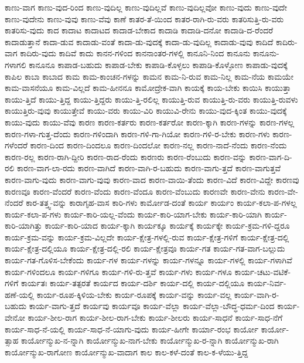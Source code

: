 {ಕಾಣು-ವಾಗ
ಕಾಣು-ವುದ-ರಿಂದ
ಕಾಣು-ವುದಿಲ್ಲ
ಕಾಣು-ವುದಿಲ್ಲವೆ
ಕಾಣು-ವುದಿಲ್ಲವೋ
ಕಾಣು-ವುದು
ಕಾಣು-ವುದೇ
ಕಾಣು-ವುದೇನು
ಕಾಣು-ವುವು
ಕಾಣು-ವೆವು
ಕಾಣೆ
ಕಾತರ-ತೆ-ಯಿಂದ
ಕಾತರ-ರಾಗಿ-ರು-ವರು
ಕಾತರಿಸುತ್ತಿ-ರು-ವರು
ಕಾತರಿಸು-ವುದು
ಕಾದ
ಕಾದಾಟ
ಕಾದಾಟದ
ಕಾದಾಡ-ಬೇಕಾದ
ಕಾದಾಡಿ
ಕಾದಾಡಿ-ದನೋ
ಕಾದಾಡಿ-ದ-ರೆಂದರೆ
ಕಾದಾಡುತ್ತಾನೆ
ಕಾದಾ-ಡುವ
ಕಾದಾಡು-ವಂತೆ
ಕಾದಾ-ಡು-ವುದಕ್ಕೆ
ಕಾದಾ-ಡು-ವುದಿಲ್ಲ
ಕಾದಾಡು-ವುವು
ಕಾದಿದೆ
ಕಾದಿರು-ವಾಗ
ಕಾದಿರು-ವುದು
ಕಾದಿವೆ
ಕಾದು
ಕಾನನ-ಗಳಿಂದ
ಕಾನನಾಂತರ-ಗಳಲ್ಲಿ
ಕಾನೂನಿ-ನಿಂದ
ಕಾನೂನು
ಕಾನೂನು-ಗಳಾಗಲಿ
ಕಾನೂನೂ
ಕಾಪಾಡ-ಬಹುದು
ಕಾಪಾಡ-ಬೇಕು
ಕಾಪಾಡಿ-ಕೊಳ್ಳಲು
ಕಾಪಾಡಿ-ಕೊಳ್ಳೋಣ
ಕಾಪಾಡು-ವುದಕ್ಕೆ
ಕಾಪಿಲ
ಕಾಬಾ
ಕಾಬಾದ
ಕಾಮ
ಕಾಮ-ಕಾಂಚನ-ಗಳನ್ನು
ಕಾಮನ
ಕಾಮ-ನಿ-ರುವ
ಕಾಮ-ನಿಲ್ಲ
ಕಾಮ-ನೆಯ
ಕಾಮಯೇ
ಕಾಮ-ವಾಸನೆಯೂ
ಕಾಮ-ವಿಲ್ಲದೆ
ಕಾಮ-ಹೀನನೂ
ಕಾಮೋದ್ರೇಕ-ವಾಗಿ
ಕಾಯಕ್ಕೆ
ಕಾಯ-ಬೇಕು
ಕಾಯಿಸಿ
ಕಾಯುತ್ತಾ
ಕಾಯು-ತ್ತಿದೆ
ಕಾಯು-ತ್ತಿದ್ದ
ಕಾಯು-ತ್ತಿದ್ದರು
ಕಾಯು-ತ್ತಿ-ರಲಿಲ್ಲ
ಕಾಯುತ್ತಿ-ರುವ
ಕಾಯುತ್ತಿ-ರು-ವರು
ಕಾಯುತ್ತಿ-ರುವಳು
ಕಾಯುತ್ತಿರು-ವುವು
ಕಾಯುತ್ತೇವೆ
ಕಾಯು-ವರು
ಕಾಯು-ವಿರಿ
ಕಾಯುವಿ-ರೇನು
ಕಾಯು-ವುದ-ಕ್ಕಿಂತ
ಕಾಯು-ವುದಕ್ಕೆ
ಕಾಯು-ವುದು
ಕಾಯು-ವೆವು
ಕಾರಣ
ಕಾರಣ-ಕರ್ತರು
ಕಾರಣ-ಕರ್ತರೋ
ಕಾರಣ-ಕ್ಕಾಗಿ
ಕಾರಣ-ಗಳನ್ನು
ಕಾರಣ-ಗಳಲ್ಲ
ಕಾರಣ-ಗಳಾ-ಗುತ್ತ-ದೆಂದು
ಕಾರಣ-ಗಳಿಂದಾಗಿ
ಕಾರಣ-ಗಳಿ-ಗಾ-ಗಿಯೋ
ಕಾರಣ-ಗಳಿ-ರ-ಬೇಕು
ಕಾರಣ-ಗಳು
ಕಾರಣ-ಗಳೆಂದರೆ
ಕಾರಣ-ದಿಂದ
ಕಾರಣ-ದಿಂದಲೂ
ಕಾರಣ-ದಿಂದಲೋ
ಕಾರಣ-ನಲ್ಲ
ಕಾರಣ-ನಾದೆ-ನೆಂದು
ಕಾರಣ-ನೆಂದು
ಕಾರಣ-ರಲ್ಲ
ಕಾರಣ-ರಾಗಿ-ದ್ದೀರಿ
ಕಾರಣ-ರಾದ-ರೆಂದು
ಕಾರಣರು
ಕಾರಣ-ರೆಂಬುದು
ಕಾರಣ-ವನ್ನು
ಕಾರಣ-ವಾಗ-ದಿ-ರಲಿ
ಕಾರಣ-ವಾಗ-ಲಾ-ರದು
ಕಾರಣ-ವಾಗಿದೆ
ಕಾರಣ-ವಾಗಿ-ರ-ಬಹುದು
ಕಾರಣ-ವಾಗು-ತ್ತದೆ
ಕಾರಣ-ವಾಗುತ್ತವೆ
ಕಾರಣ-ವಾಗು-ವುದು
ಕಾರಣ-ವಾಗು-ವುವು
ಕಾರಣ-ವಾದ
ಕಾರಣ-ವಾಯಿ-ತೆಂದು
ಕಾರಣ-ವಿದೆ
ಕಾರಣ-ವಿದ್ದೇ
ಕಾರಣವು
ಕಾರಣವೂ
ಕಾರಣ-ವೆಂದರೆ
ಕಾರಣ-ವೆಂದು
ಕಾರಣ-ವೆಂದೂ
ಕಾರಣ-ವೆಂಬುದು
ಕಾರಣವೇ
ಕಾರಣ-ವೇನು
ಕಾರಣ-ವೇ-ನೆಂದರೆ
ಕಾರ-ತತ್ತ್ವ-ವನ್ನು
ಕಾರಾಗೃಹ-ವಾಸ
ಕಾರಿ-ಗಳು
ಕಾರ್ಮೋಡ-ದಂತೆ
ಕಾರ್ಯ
ಕಾರ್ಯಂ
ಕಾರ್ಯ-ಕಲಾ-ಪ-ಗಳಲ್ಲ
ಕಾರ್ಯ-ಕಲಾ-ಪ-ಗಳು
ಕಾರ್ಯ-ಕಾರಿ-ಯಲ್ಲ-ವೆಂದು
ಕಾರ್ಯ-ಕಾರಿ-ಯಾಗ-ಬೇಕು
ಕಾರ್ಯ-ಕಾರಿ-ಯಾಗಿ
ಕಾರ್ಯ-ಕಾರಿ-ಯಾಗಿತ್ತು
ಕಾರ್ಯ-ಕಾರಿ-ಯಾದ
ಕಾರ್ಯ-ಕ್ಕಾಗಿ
ಕಾರ್ಯಕ್ಕೂ
ಕಾರ್ಯಕ್ಕೆ
ಕಾರ್ಯಕ್ಕೇ
ಕಾರ್ಯ-ಕ್ರಮ-ಗಳಿ-ದ್ದರೂ
ಕಾರ್ಯ-ಕ್ರಮ-ವನ್ನು
ಕಾರ್ಯ-ಕ್ರಮ-ವಿಲ್ಲದೇ
ಕಾರ್ಯ-ಕ್ಷೇತ್ರ-ಗಳಲ್ಲಿ-ರುವ
ಕಾರ್ಯ-ಕ್ಷೇತ್ರ-ಗಳಿಗೆ
ಕಾರ್ಯ-ಕ್ಷೇತ್ರ-ದಲ್ಲಿ
ಕಾರ್ಯ-ಕ್ಷೇತ್ರ-ದಲ್ಲಿಯೂ
ಕಾರ್ಯ-ಕ್ಷೇತ್ರ-ದಲ್ಲಿ-ರಲಿ
ಕಾರ್ಯ-ಕ್ಷೇತ್ರವೂ
ಕಾರ್ಯ-ಗತ
ಕಾರ್ಯ-ಗತ-ವಾಗ-ಬಲ್ಲುದು
ಕಾರ್ಯ-ಗತ-ಗೊಳಿಸ-ಬೇಕೆಂದು
ಕಾರ್ಯ-ಗಳ
ಕಾರ್ಯ-ಗಳನ್ನು
ಕಾರ್ಯ-ಗಳನ್ನೂ
ಕಾರ್ಯ-ಗಳಲ್ಲಿ
ಕಾರ್ಯ-ಗಳಾಗಿವೆ
ಕಾರ್ಯ-ಗಳಿಂದಲೂ
ಕಾರ್ಯ-ಗಳಿಗೂ
ಕಾರ್ಯ-ಗಳಿ-ರು-ತ್ತವೆ
ಕಾರ್ಯ-ಗಳು
ಕಾರ್ಯ-ಗಳೂ
ಕಾರ್ಯ-ಚಟು-ವಟಿಕೆ-ಗಳಿಗೆ
ಕಾರ್ಯತಃ
ಕಾರ್ಯ-ತತ್ಪರತೆ
ಕಾರ್ಯದ
ಕಾರ್ಯ-ದರ್ಶಿ
ಕಾರ್ಯ-ದಲ್ಲಿ
ಕಾರ್ಯ-ದಲ್ಲಿಯೂ
ಕಾರ್ಯ-ನಿರ್ವ-ಹಣೆ-ಯಲ್ಲಿ
ಕಾರ್ಯ-ರೂಪ-ಕ್ಕಿಳಿಯ-ಬೇಕು
ಕಾರ್ಯ-ರೂಪಕ್ಕೆ
ಕಾರ್ಯ-ವನ್ನು
ಕಾರ್ಯ-ವಲ್ಲ
ಕಾರ್ಯ-ವಾಗಿ-ರ-ಬಹುದು
ಕಾರ್ಯ-ವಾಗು-ತ್ತದೆ
ಕಾರ್ಯವು
ಕಾರ್ಯವೂ
ಕಾರ್ಯ-ವೆಲ್ಲಾ
ಕಾರ್ಯ-ವೆಲ್ಲಾ-ಬೌದ್ಧ-ಧರ್ಮ-ದಿಂದ
ಕಾರ್ಯ-ವೇನೋ
ಕಾರ್ಯ-ಶೀಲ-ರಾಗ
ಕಾರ್ಯ-ಶೀಲ-ರಾಗ-ಬೇಕು
ಕಾರ್ಯ-ಶೀಲರು
ಕಾರ್ಯ-ಸಾಧನೆ
ಕಾರ್ಯ-ಸಾಧ-ನೆಗೆ
ಕಾರ್ಯ-ಸಾಧ-ನೆ-ಯಲ್ಲಿ
ಕಾರ್ಯ-ಸಾಧ-ನೆ-ಯಾಗು-ವುದು
ಕಾರ್ಯ-ಹೀಗೇ
ಕಾರ್ಯಾ-ರಂಭ
ಕಾರ್ಯೋ
ಕಾರ್ಯೋ-ತ್ಸಾಹ
ಕಾರ್ಯೋನ್ಮುಖ-ನ-ನ್ನಾಗಿ
ಕಾರ್ಯೋನ್ಮುಖ-ನಾಗ-ಬೇಕು
ಕಾರ್ಯೋನ್ಮುಖ-ರ-ನ್ನಾಗಿ
ಕಾರ್ಯೋನ್ಮುಖ-ರಾಗಿ
ಕಾರ್ಯೋನ್ಮುಖ-ರಾಗೋಣ
ಕಾರ್ಯೋನ್ಮುಖ-ವಾದಾಗ
ಕಾಲ
ಕಾಲ-ಕಳೆ-ದಂತೆ
ಕಾಲ-ಕ-ಳೆಯು-ತ್ತಿದ್ದ
}
